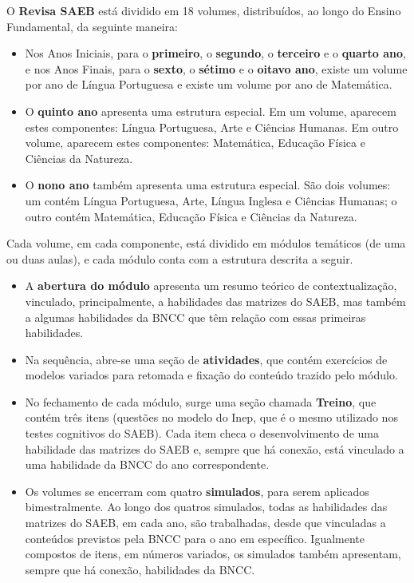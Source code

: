O \textbf{Revisa SAEB} está dividido em 18 volumes, distribuídos, ao
longo do Ensino Fundamental, da seguinte maneira:

\begin{itemize}
\item
  Nos Anos Iniciais, para o \textbf{primeiro}, o \textbf{segundo}, o
  \textbf{terceiro} e o \textbf{quarto ano}, e nos Anos Finais, para o
  \textbf{sexto}, o \textbf{sétimo} e o \textbf{oitavo ano}, existe um
  volume por ano de Língua Portuguesa e existe um volume por ano de
  Matemática.
\item
  O \textbf{quinto ano} apresenta uma estrutura especial. Em um volume,
  aparecem estes componentes: Língua Portuguesa, Arte e Ciências
  Humanas. Em outro volume, aparecem estes componentes: Matemática,
  Educação Física e Ciências da Natureza.
\item
  O \textbf{nono ano} também apresenta uma estrutura especial. São dois
  volumes: um contém Língua Portuguesa, Arte, Língua Inglesa e Ciências
  Humanas; o outro contém Matemática, Educação Física e Ciências da
  Natureza.
\end{itemize}

Cada volume, em cada componente, está dividido em módulos temáticos (de
uma ou duas aulas), e cada módulo conta com a estrutura descrita a
seguir.

\begin{itemize}
\item
  A \textbf{abertura do módulo} apresenta um resumo teórico de
  contextualização, vinculado, principalmente, a habilidades das
  matrizes do SAEB, mas também a algumas habilidades da BNCC que têm
  relação com essas primeiras habilidades.
\item
  Na sequência, abre-se uma seção de \textbf{atividades}, que contém
  exercícios de modelos variados para retomada e fixação
  do conteúdo trazido pelo módulo.
\item
  No fechamento de cada módulo, surge uma seção chamada \textbf{Treino},
  que contém três itens (questões no modelo do Inep, que é o mesmo
  utilizado nos testes cognitivos do SAEB). Cada item checa o
  desenvolvimento de uma habilidade das matrizes do SAEB e, sempre que
  há conexão, está vinculado a uma habilidade da BNCC do ano
  correspondente.
\item
  Os volumes se encerram com quatro \textbf{simulados}, para serem
  aplicados bimestralmente. Ao longo dos quatros simulados, todas as
  habilidades das matrizes do SAEB, em cada ano, são trabalhadas, desde
  que vinculadas a conteúdos previstos pela BNCC para o ano em
  específico. Igualmente compostos de itens, em números variados, os
  simulados também apresentam, sempre que há conexão, habilidades da
  BNCC.
\end{itemize}
